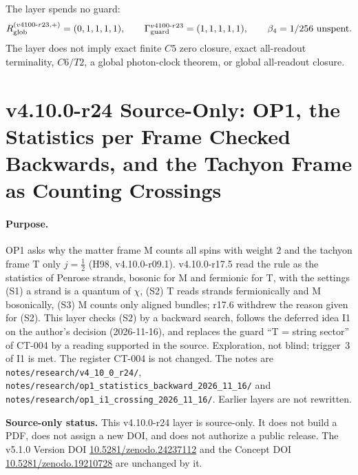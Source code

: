 The layer spends no guard:
\[
R_{\rm glob}^{(v4100\text{-}r23,+)}=(0,1,1,1,1),
\qquad
\Gamma_{\rm guard}^{v4100\text{-}r23}=(1,1,1,1,1),
\qquad
\beta_4=1/256\ \text{unspent}.
\]
The layer does not imply exact finite \(C5\) zero closure, exact all-readout terminality, \(C6/T2\), a global photon-clock theorem,
or global all-readout closure.

\clearpage
\section*{v4.10.0-r24 Source-Only: OP1, the Statistics per Frame Checked Backwards, and the Tachyon Frame as Counting Crossings}
\label{sec:v4100-r24-op1-crossing}

\paragraph{Purpose.}
OP1 asks why the matter frame M counts all spins with weight \(2\) and the tachyon frame T only \(j=\tfrac12\) (H98, v4.10.0-r09.1).
v4.10.0-r17.5 read the rule as the statistics of Penrose strands, bosonic for M and fermionic for T, with the settings (S1) a strand is a
quantum of \(\chi\), (S2) T reads strands fermionically and M bosonically, (S3) M counts only aligned bundles; r17.6 withdrew the reason
given for (S2).  This layer checks (S2) by a backward search, follows the deferred idea I1 on the author's decision (2026-11-16), and
replaces the guard ``T = string sector'' of CT-004 by a reading supported in the source.  Exploration, not blind; trigger~3 of I1 is
met.  The register CT-004 is not changed.  The notes are \texttt{notes/\allowbreak research/\allowbreak v4\_10\_0\_r24/},
\texttt{notes/\allowbreak research/\allowbreak op1\_statistics\_backward\_2026\_11\_16/} and
\texttt{notes/\allowbreak research/\allowbreak op1\_i1\_crossing\_2026\_11\_16/}.  Earlier layers are not rewritten.

\noindent\textbf{Source-only status.}
This v4.10.0-r24 layer is source-only.  It does not build a PDF, does not assign a new DOI,
and does not authorize a public release.  The v5.1.0 Version DOI
\href{https://doi.org/10.5281/zenodo.24237112}{10.5281/zenodo.24237112} and the Concept DOI
\href{https://doi.org/10.5281/zenodo.19210728}{10.5281/zenodo.19210728} are unchanged by it.

